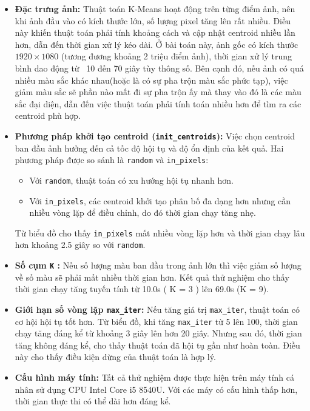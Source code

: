 \begin{itemize}
	\item \textbf{Đặc trưng ảnh:} Thuật toán K-Means hoạt động trên từng điểm ảnh, nên khi ảnh đầu vào có kích thước lớn, số lượng pixel tăng lên rất nhiều. Điều này khiến thuật toán phải tính khoảng cách và cập nhật centroid nhiều lần hơn, dẫn đến thời gian xử lý kéo dài. Ở bài toán này, ảnh gốc có kích thước $1920 \times 1080$ (tương đương khoảng 2 triệu điểm ảnh), thời gian xử lý trung bình dao động từ ~10 đến 70 giây tùy thông số. Bên cạnh đó, nếu ảnh có quá nhiều màu sắc khác nhau(hoặc là có sự pha trộn màu sắc phức tạp), việc giảm màu sắc sẽ phần nào mất đi sự pha trộn ấy mà thay vào đó là các màu sắc đại diện, dẫn đến việc thuật toán phải tính toán nhiều hơn để tìm ra các centroid phù hợp.

	\item \textbf{Phương pháp khởi tạo centroid (\texttt{init\_centroids}):} Việc chọn centroid ban đầu ảnh hưởng đến cả tốc độ hội tụ và độ ổn định của kết quả. Hai phương pháp được so sánh là \texttt{random} và \texttt{in\_pixels}:
	      \begin{itemize}
		      \item Với \texttt{random}, thuật toán có xu hướng hội tụ nhanh hơn.
		      \item Với \texttt{in\_pixels}, các centroid khởi tạo phân bố đa dạng hơn nhưng cần nhiều vòng lặp để điều chỉnh, do đó thời gian chạy tăng nhẹ.
	      \end{itemize}
	      Từ biểu đồ cho thấy \texttt{in\_pixels} mất nhiều vòng lặp hơn và thời gian chạy lâu hơn khoảng 2.5 giây so với \texttt{random}.

	\item \textbf{Số cụm \texttt{K} :} Nếu số lượng màu ban đầu trong ảnh lớn thì việc giảm số lượng về số màu sẽ phải mất nhiều thời gian hơn. Kết quả thử nghiệm cho thấy thời gian chạy tăng tuyến tính từ 10.0s ( K = 3 ) lên 69.0s (K = 9).

	\item \textbf{Giới hạn số vòng lặp \texttt{max\_iter}:} Nếu tăng giá trị \texttt{max\_iter}, thuật toán có cơ hội hội tụ tốt hơn. Từ biểu đồ, khi tăng \texttt{max\_iter} từ 5 lên 100, thời gian chạy tăng đáng kể từ khoảng 3 giây lên hơn 20 giây. Nhưng sau đó, thời gian tăng không đáng kể, cho thấy thuật toán đã hội tụ gần như hoàn toàn. Điều này cho thấy điều kiện dừng của thuật toán là hợp lý.

	\item \textbf{Cấu hình máy tính:} Tất cả thử nghiệm được thực hiện trên máy tính cá nhân sử dụng CPU Intel Core i5 8540U. Với các máy có cấu hình thấp hơn, thời gian thực thi có thể dài hơn đáng kể.

\end{itemize}

